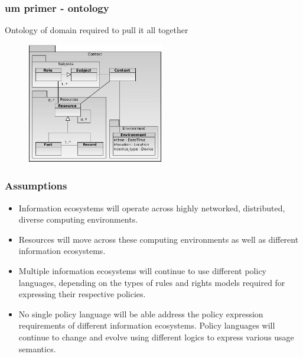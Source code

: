 \documentclass[t, 10pt]{beamer}
\begin{document}
\begin{frame}
\frametitle{um primer - ontology}

Ontology of domain required to pull it all together
\begin{figure}
\includegraphics[width = 6cm]{UMOntology}
\end{figure}

\end{frame}

\begin{frame}
\frametitle{Assumptions}

\begin{itemize}
	\item Information ecosystems will operate across highly networked,
distributed, diverse computing environments.
\pause
	\item Resources will move across these computing environments
as well as different information ecosystems.
\pause
	\item Multiple information ecosystems will continue to use different
policy languages, depending on the types of rules and
rights models required for expressing their respective policies.
\pause
	\item No single policy language will be able address the policy expression
requirements of different information ecosystems.
Policy languages will continue to change and evolve using
different logics to express various usage semantics.
\end{itemize}

\end{frame}

%
%
\end{document}
